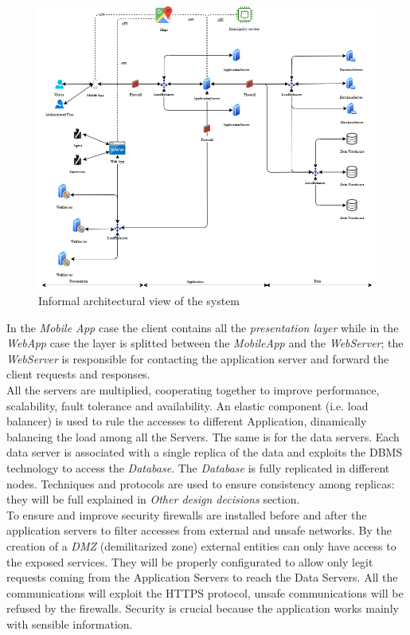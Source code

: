 \documentclass[a4paper]{report}
\begin{document}
\begin{figure}[htp]
\includegraphics[scale=0.55]{SystemArchitecture}
\caption{Informal architectural view of the system}
\label{fig:architecture-diagram}
\end{figure}
In the \textit{Mobile App} case the client contains all the \textit{presentation layer} while in the \textit{WebApp} case the layer is splitted between the \textit{MobileApp} and the \textit{WebServer}; the \textit{WebServer} is responsible for contacting the application server and forward the client requests and responses.\\
All the servers are multiplied, cooperating together to improve performance, scalability, fault tolerance and availability. An elastic component (i.e. load balancer) is used to rule the accesses to different Application, dinamically balancing the load among all the Servers. The same is for the data servers.
Each data server is associated with a single replica of the data and exploits the DBMS technology to access the \textit{Database}. The \textit{Database} is fully replicated in different nodes. Techniques and protocols are used to ensure consistency among replicas: they will be full explained in \textit{Other design decisions} section.\\
To ensure and improve security firewalls are installed before and after the application servers to filter accesses from external and unsafe networks. By the creation of a \textit{DMZ} (demilitarized zone) external entities can only have access to the exposed services. They will be properly configurated to allow only legit requests coming from the Application Servers to reach the Data Servers. All the communications will exploit the HTTPS protocol, unsafe communications will be refused by the firewalls. Security is crucial because the application works mainly with sensible information. 
\end{document}

